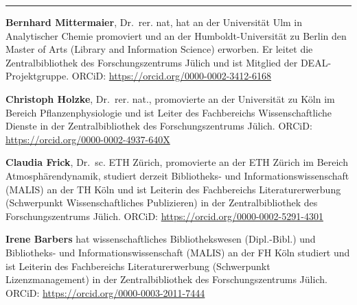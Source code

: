 \begin{center}\rule{0.5\linewidth}{\linethickness}\end{center}

\textbf{Bernhard Mittermaier}, Dr.~rer. nat, hat an der Universität Ulm
in Analytischer Chemie promoviert und an der Humboldt-Universität zu
Berlin den Master of Arts (Library and Information Science) erworben. Er
leitet die Zentralbibliothek des Forschungszentrums Jülich und ist
Mitglied der DEAL-Projektgruppe. ORCiD:
\href{https://orcid.org/0000-0002-3412-6168}{https://orcid.org/0000-0002-3412-6168}

\textbf{Christoph Holzke}, Dr.~rer. nat., promovierte an der Universität
zu Köln im Bereich Pflanzenphysiologie und ist Leiter des Fachbereichs
Wissenschaftliche Dienste in der Zentralbibliothek des
Forschungszentrums Jülich. ORCiD:
\href{https://orcid.org/0000-0002-4937-640X}{https://orcid.org/0000-0002-4937-640X}

\textbf{Claudia Frick}, Dr.~sc. ETH Zürich, promovierte an der ETH
Zürich im Bereich Atmosphärendynamik, studiert derzeit Bibliotheks- und
Informationswissenschaft (MALIS) an der TH Köln und ist Leiterin des
Fachbereichs Literaturerwerbung (Schwerpunkt Wissenschaftliches
Publizieren) in der Zentralbibliothek des Forschungszentrums Jülich.
ORCiD:
\href{https://orcid.org/0000-0002-5291-4301}{https://orcid.org/0000-0002-5291-4301}

\textbf{Irene Barbers} hat wissenschaftliches Bibliothekswesen
(Dipl.-Bibl.) und Bibliotheks- und Informationswissenschaft (MALIS) an
der FH Köln studiert und ist Leiterin des Fachbereichs
Literaturerwerbung (Schwerpunkt Lizenzmanagement) in der
Zentralbibliothek des Forschungszentrums Jülich. ORCiD:
\href{https://orcid.org/0000-0003-2011-7444}{https://orcid.org/0000-0003-2011-7444}

